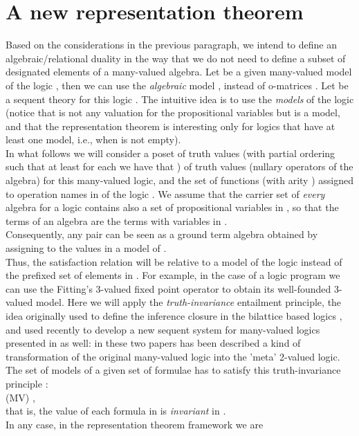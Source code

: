 \documentclass[10pt,twocolumn]{article}
\begin{document}
\section{A new representation theorem}
Based on the considerations in the previous paragraph, we intend to
define an algebraic/relational duality in the way that we do not
need to  define a subset of designated elements  of a many-valued
algebra. Let  be a given many-valued model of
the logic , then we can use the \emph{algebraic} model
, instead of o-matrices . Let
 be a sequent theory for this logic . The intuitive idea
is to use the \emph{models}  of the logic  (notice
that  is not any valuation for the propositional
variables but is a model, and that the representation theorem is
interesting only for logics that have at least one model, i.e.,
when  is not empty).\\
In what follows we will consider a poset   of truth values (with
partial ordering  such that at least for each 
we have that ) of truth values (nullary operators
of the algebra) for this many-valued logic, and  the set of functions  (with arity ) assigned to operation names in  of the logic .
 We assume  that the
carrier set of \emph{every} algebra for a logic  contains also a
set of propositional variables in , so that the terms of an
algebra  are the terms with variables in .\\
Consequently, any pair  can be seen as a ground term
algebra
obtained by assigning to  the values in a model  of .\\
Thus, the satisfaction relation  will be relative to a
model  of the logic  instead of the prefixed set of elements
in . For example, in the case of a  logic program  we can use
the Fitting's 3-valued fixed point operator to obtain its
well-founded 3-valued model. Here we will apply the
\emph{truth-invariance} entailment principle, the idea originally
used to define the inference closure in the bilattice based logics
\cite{MajkC04}, and used recently to develop a new  sequent system
for many-valued logics presented in \cite{Majk09BS} as well: in
these two papers has been described a kind of transformation of the
original many-valued logic into the 'meta' 2-valued logic. The set
of models  of a given set  of formulae has to
satisfy
this truth-invariance principle \cite{Majk09BS}: \\
(MV) ,\\ that is, the value of each
formula in
 is \emph{invariant} in . \\
In any case, in the representation theorem framework we are
\end{document}
